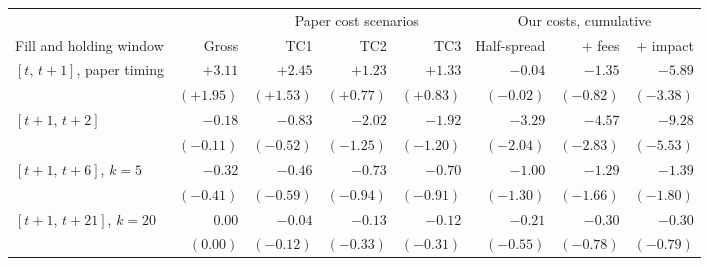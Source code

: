 \begin{tabular}{@{}l r r r r r r r@{}}
\toprule
 & & \multicolumn{3}{c}{Paper cost scenarios} & \multicolumn{3}{c}{Our costs, cumulative} \\
\cmidrule(lr){3-5}\cmidrule(l){6-8}
Fill and holding window & Gross & TC1 & TC2 & TC3 & Half-spread & $+$ fees & $+$ impact \\
\midrule
$[t,\,t+1]$, paper timing & $+3.11$ & $+2.45$ & $+1.23$ & $+1.33$ & $-0.04$ & $-1.35$ & $-5.89$ \\
 & $(+1.95)$ & $(+1.53)$ & $(+0.77)$ & $(+0.83)$ & $(-0.02)$ & $(-0.82)$ & $(-3.38)$ \\
\addlinespace[2pt]
$[t+1,\,t+2]$ & $-0.18$ & $-0.83$ & $-2.02$ & $-1.92$ & $-3.29$ & $-4.57$ & $-9.28$ \\
 & $(-0.11)$ & $(-0.52)$ & $(-1.25)$ & $(-1.20)$ & $(-2.04)$ & $(-2.83)$ & $(-5.53)$ \\
\addlinespace[2pt]
$[t+1,\,t+6]$, $k=5$ & $-0.32$ & $-0.46$ & $-0.73$ & $-0.70$ & $-1.00$ & $-1.29$ & $-1.39$ \\
 & $(-0.41)$ & $(-0.59)$ & $(-0.94)$ & $(-0.91)$ & $(-1.30)$ & $(-1.66)$ & $(-1.80)$ \\
\addlinespace[2pt]
$[t+1,\,t+21]$, $k=20$ & $0.00$ & $-0.04$ & $-0.13$ & $-0.12$ & $-0.21$ & $-0.30$ & $-0.30$ \\
 & $(0.00)$ & $(-0.12)$ & $(-0.33)$ & $(-0.31)$ & $(-0.55)$ & $(-0.78)$ & $(-0.79)$ \\
\bottomrule
\end{tabular}
